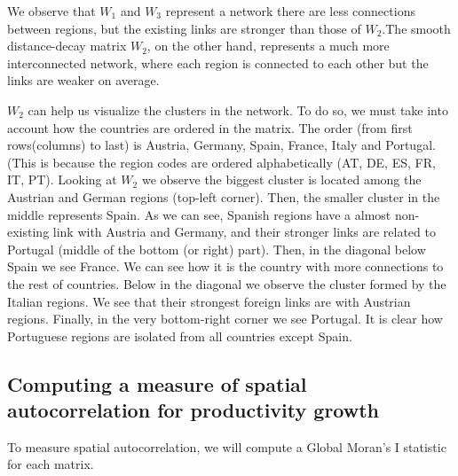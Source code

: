 \documentclass[
  a4paper,
]{article}
\begin{document}
We observe that \(W_1\) and \(W_3\) represent a network there are less
connections between regions, but the existing links are stronger than
those of \(W_2\).The smooth distance-decay matrix \(W_2\), on the other
hand, represents a much more interconnected network, where each region
is connected to each other but the links are weaker on average.

\(W_2\) can help us visualize the clusters in the network. To do so, we
must take into account how the countries are ordered in the matrix. The
order (from first rows(columns) to last) is Austria, Germany, Spain,
France, Italy and Portugal. (This is because the region codes are
ordered alphabetically (AT, DE, ES, FR, IT, PT). Looking at \(W_2\) we
observe the biggest cluster is located among the Austrian and German
regions (top-left corner). Then, the smaller cluster in the middle
represents Spain. As we can see, Spanish regions have a almost
non-existing link with Austria and Germany, and their stronger links are
related to Portugal (middle of the bottom (or right) part). Then, in the
diagonal below Spain we see France. We can see how it is the country
with more connections to the rest of countries. Below in the diagonal we
observe the cluster formed by the Italian regions. We see that their
strongest foreign links are with Austrian regions. Finally, in the very
bottom-right corner we see Portugal. It is clear how Portuguese regions
are isolated from all countries except Spain.

\subsection{Computing a measure of spatial autocorrelation for
productivity
growth}\label{computing-a-measure-of-spatial-autocorrelation-for-productivity-growth}

To measure spatial autocorrelation, we will compute a Global Moran's I
statistic for each matrix.
\end{document}
